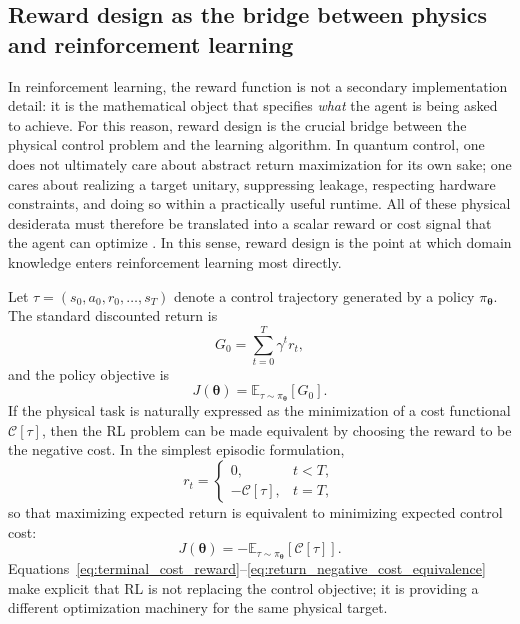 \subsection{Reward design as the bridge between physics and reinforcement learning}
\label{subsec:reward_design_bridge_physics_rl}

In reinforcement learning, the reward function is not a secondary implementation detail: it is the mathematical object that specifies \emph{what} the agent is being asked to achieve. For this reason, reward design is the crucial bridge between the physical control problem and the learning algorithm. In quantum control, one does not ultimately care about abstract return maximization for its own sake; one cares about realizing a target unitary, suppressing leakage, respecting hardware constraints, and doing so within a practically useful runtime. All of these physical desiderata must therefore be translated into a scalar reward or cost signal that the agent can optimize \cite{SuttonBarto2018,Giannelli2022,Niu2019}. In this sense, reward design is the point at which domain knowledge enters reinforcement learning most directly.

Let $\tau=(s_0,a_0,r_0,\dots,s_T)$ denote a control trajectory generated by a policy $\pi_{\bm{\theta}}$. The standard discounted return is
\begin{equation}
G_0
=
\sum_{t=0}^{T} \gamma^t r_t,
\label{eq:reward_return_def}
\end{equation}
and the policy objective is
\begin{equation}
J(\bm{\theta})
=
\mathbb{E}_{\tau\sim\pi_{\bm{\theta}}}[G_0].
\label{eq:reward_policy_objective}
\end{equation}
If the physical task is naturally expressed as the minimization of a cost functional $\mathcal{C}[\tau]$, then the RL problem can be made equivalent by choosing the reward to be the negative cost. In the simplest episodic formulation,
\begin{equation}
r_t =
\begin{cases}
0, & t<T,\\[0.3em]
-\mathcal{C}[\tau], & t=T,
\end{cases}
\label{eq:terminal_cost_reward}
\end{equation}
so that maximizing expected return is equivalent to minimizing expected control cost:
\begin{equation}
J(\bm{\theta})
=
-\mathbb{E}_{\tau\sim\pi_{\bm{\theta}}}
\left[
\mathcal{C}[\tau]
\right].
\label{eq:return_negative_cost_equivalence}
\end{equation}
Equations~\eqref{eq:terminal_cost_reward}--\eqref{eq:return_negative_cost_equivalence} make explicit that RL is not replacing the control objective; it is providing a different optimization machinery for the same physical target.

